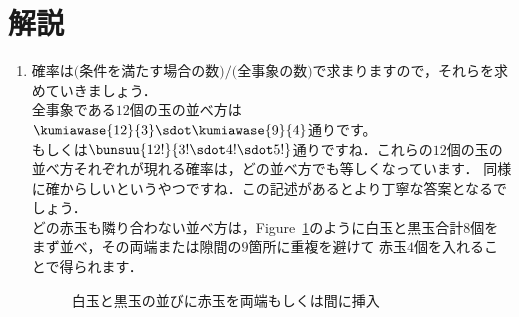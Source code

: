 \documentclass[../../../doc/main]{subfiles}
\begin{document}
    \setcounter{chapter}{2}
    \setcounter{section}{2}
    \section{解説}\label{解説2}
    \begin{enumerate}
        \item [\kakkoichi]
            \textcolor{myBlue2}{確率は$\text{(条件を満たす場合の数)}/\text{(全事象の数)}$で求まりますので，それらを求めていきましょう．} \\
            全事象である$12$個の玉の並べ方は$\kumiawase{12}{3}\sdot\kumiawase{9}{4}$通りです。 \\
            \textcolor{myBlue2}{もしくは$\bunsuu{12!}{3!\sdot4!\sdot5!}$通りですね．これらの$12$個の玉の並べ方それぞれが現れる確率は，どの並べ方でも等しくなっています．
            同様に確からしいというやつですね．この記述があるとより丁寧な答案となるでしょう．}\\
            どの赤玉も隣り合わない並べ方は，Figure~\ref{白玉と黒玉の並びに赤玉を両端もしくは間に挿入}のように白玉と黒玉合計$8$個をまず並べ，その両端または隙間の$9$箇所に重複を避けて
            赤玉$4$個を入れることで得られます．
            \begin{figure}[htbp]
                \centering
                \caption{白玉と黒玉の並びに赤玉を両端もしくは間に挿入}
                \label{白玉と黒玉の並びに赤玉を両端もしくは間に挿入}
            \end{figure}\\

\end{enumerate}
\end{document}

